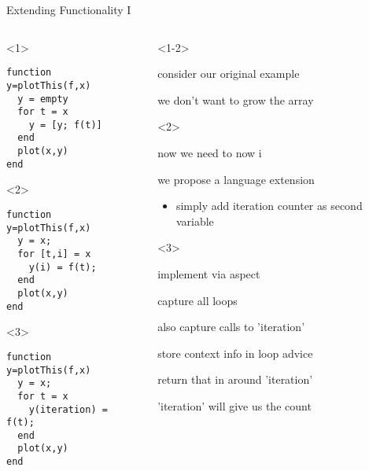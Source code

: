 \begin{frame}[fragile]{Extending Functionality I}
  \begin{columns}
    \begin{column}{5cm}
          \begin{onlyenv}<1>
        \begin{Verbatim}[commandchars=@\[\]]
function y=plotThis(f,x)
  y = empty
  for t = x
    y = [y; f(t)]
  end
  plot(x,y)
end
        \end{Verbatim}
          \end{onlyenv}
          \begin{onlyenv}<2>
        \begin{Verbatim}[commandchars=@\[\]]
function y=plotThis(f,x)
  y = x;
  for [t,i] = x
    y(i) = f(t);
  end
  plot(x,y)
end
        \end{Verbatim}
          \end{onlyenv}
          \begin{onlyenv}<3>
        \begin{Verbatim}[commandchars=@\[\]]
function y=plotThis(f,x)
  y = x;
  for t = x
    y(iteration) = f(t);
  end
  plot(x,y)
end
        \end{Verbatim}
          \end{onlyenv}

      \end{column}
      \begin{column}{5cm}
      \begin{itemize}
        \begin{onlyenv}<1-2>
        \item consider our original example
        \item we don't want to grow the array
        \end{onlyenv}
        \begin{onlyenv}<2>
        \item now we need to now i
        \item we propose a language extension 
          \begin{itemize}
          \item simply add iteration counter as second variable
          \end{itemize}
        \end{onlyenv}
        \begin{onlyenv}<3>
        \item implement via aspect
        \item capture all loops
        \item also capture calls to 'iteration'
        \item store context info in loop advice
        \item return that in around 'iteration'
        \item 'iteration' will give us the count
        \end{onlyenv}
      \end{itemize}
    \end{column}
  \end{columns}
\end{frame}




